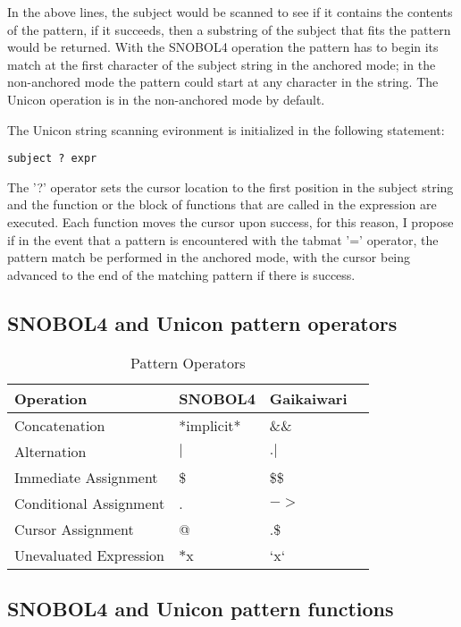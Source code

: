 \documentclass{article}
\begin{document}
In the above lines, the subject would be scanned to see if it contains the contents of the pattern, if it succeeds, then a substring of the subject that fits the pattern would be returned.  With the SNOBOL4 operation the pattern has to begin its match at the first character of the subject string in the anchored mode; in the non-anchored mode the pattern could start at any character in the string. \cite{Snobol}  The Unicon operation is in the non-anchored mode by default. \cite{Gaikaiwari2005}

The Unicon string scanning evironment is initialized in the following statement:

\linespread{1}
\begin{verbatim}
subject ? expr
\end{verbatim}

The '?' operator sets the cursor location to the first position in the subject string and the function or the block of functions that are called in the expression are executed.  Each function moves the cursor upon success, for this reason, I propose if in the event that a pattern is encountered with the tabmat '=' operator, the pattern match be performed in the anchored mode, with the cursor being advanced to the end of the matching pattern if there is success.

\subsection{SNOBOL4 and Unicon pattern operators}



\begin{table}[ht]
	\caption{Pattern Operators}
	\centering
	\begin{tabular}{|l|l|l|l|}
		\hline\hline
		Operation & SNOBOL4 & Gaikaiwari \\
		\hline
		Concatenation & *implicit* & \&\& \\
		Alternation & $|$ & $.|$ \\
		\hline
		Immediate Assignment & \$ & \$\$ \\
		Conditional Assignment & . & $->$ \\
		Cursor Assignment & @ & .\$ \\
		\hline
		Unevaluated Expression & $*$x & `x` \\
		\hline
	\end{tabular}
\end{table}
\pagebreak
\subsection{SNOBOL4 and Unicon pattern functions}
\end{document}
